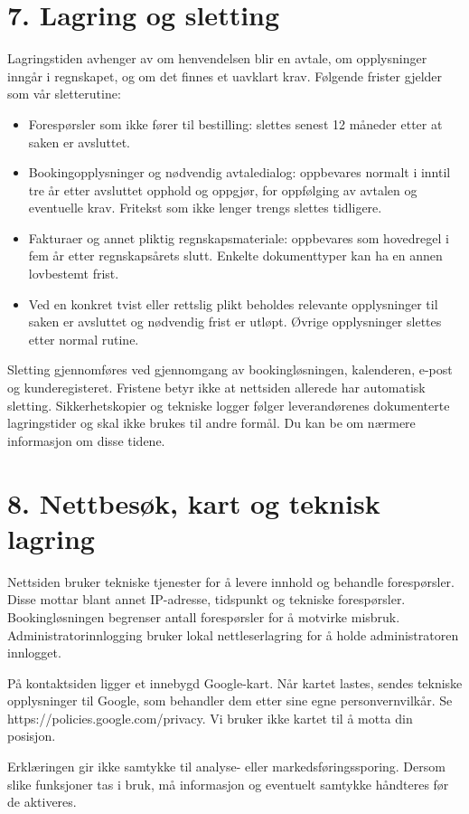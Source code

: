 \documentclass[12pt,a4paper]{article}
\begin{document}
\section{7. Lagring og sletting}
Lagringstiden avhenger av om henvendelsen blir en avtale, om opplysninger inngår i regnskapet, og om det finnes et uavklart krav. Følgende frister gjelder som vår sletterutine:

\begin{itemize}
\item Forespørsler som ikke fører til bestilling: slettes senest 12 måneder etter at saken er avsluttet.
\item Bookingopplysninger og nødvendig avtaledialog: oppbevares normalt i inntil tre år etter avsluttet opphold og oppgjør, for oppfølging av avtalen og eventuelle krav. Fritekst som ikke lenger trengs slettes tidligere.
\item Fakturaer og annet pliktig regnskapsmateriale: oppbevares som hovedregel i fem år etter regnskapsårets slutt. Enkelte dokumenttyper kan ha en annen lovbestemt frist.
\item Ved en konkret tvist eller rettslig plikt beholdes relevante opplysninger til saken er avsluttet og nødvendig frist er utløpt. Øvrige opplysninger slettes etter normal rutine.
\end{itemize}
Sletting gjennomføres ved gjennomgang av bookingløsningen, kalenderen, e-post og kunderegisteret. Fristene betyr ikke at nettsiden allerede har automatisk sletting. Sikkerhetskopier og tekniske logger følger leverandørenes dokumenterte lagringstider og skal ikke brukes til andre formål. Du kan be om nærmere informasjon om disse tidene.


\section{8. Nettbesøk, kart og teknisk lagring}
Nettsiden bruker tekniske tjenester for å levere innhold og behandle forespørsler. Disse mottar blant annet IP-adresse, tidspunkt og tekniske forespørsler. Bookingløsningen begrenser antall forespørsler for å motvirke misbruk. Administratorinnlogging bruker lokal nettleserlagring for å holde administratoren innlogget.

På kontaktsiden ligger et innebygd Google-kart. Når kartet lastes, sendes tekniske opplysninger til Google, som behandler dem etter sine egne personvernvilkår. Se https://policies.google.com/privacy. Vi bruker ikke kartet til å motta din posisjon.

Erklæringen gir ikke samtykke til analyse- eller markedsføringssporing. Dersom slike funksjoner tas i bruk, må informasjon og eventuelt samtykke håndteres før de aktiveres.
\end{document}
